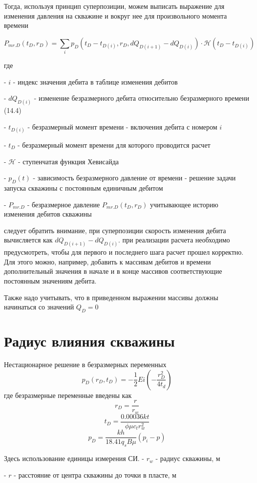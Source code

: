 \documentclass[oneside, openany]{memoir}
\begin{document}
	Тогда, используя принцип суперпозиции, можем выписать выражение для изменения давления на скважине и вокруг нее для произвольного момента времени
	
	$$P_{mr.D}(t_D, r_D) = \sum_i  p_D\left(t_D-t_{D(i)}, r_D, dQ_{D(i+1)} - dQ_{D(i)}\right)\cdot \mathcal{H}(t_D-t_{D(i)}) $$
	
	где
	
	- $i$ - индекс значения дебита в таблице изменения дебитов
	
	- $dQ_{D(i)}$ - изменение безразмерного дебита относительно безразмерного времени (14.4) 
	
	- $t_{D(i)}$ - безразмерный момент времени - включения дебита с номером $i$
	
	- $t_{D}$ - безразмерный момент времени для которого проводится расчет
	
	- $\mathcal{H}$ - ступенчатая функция Хевисайда
	
	- $p_D\left(t\right)$ - зависимость безразмерного давление от времени - решение задачи запуска скважины с постоянным единичным дебитом
	
	- $P_{mr.D} $ - безразмерное давление $P_{mr.D}(t_D, r_D)$ учитывающее историю изменения дебитов скважины
	
	следует обратить внимание, при суперпозиции скорость изменения дебита вычисляется как $dQ_{D(i+1)} - dQ_{D(i)}$.  при реализации расчета необходимо предусмотреть, чтобы для первого и последнего шага расчет прошел корректно. Для этого можно, например, добавить к массивам дебитов и времени дополнительный значения в начале и в конце массивов соответствующие постоянным значениям дебита. 
	
	Также надо учитывать, что в приведенном выражении массивы должны начинаться со значений $Q_D=0$
	
	\section{Радиус влияния скважины}
	
	
	Нестационарное решение в безразмерных переменных
	$$ 
	p_D(r_D,t_D) = - \frac{1}{2} Ei \left(- \dfrac{ r_D^2}{4t_d} \right)
	$$
	где безразмерные переменные введены как
	$$ r_D = \frac{r}{r_w}  $$
	$$ t_D = \frac{0.00036 kt}{\phi \mu c_t r_w^2}  $$
	$$ p_D = \frac{kh}{ 18.41 q_s B \mu} \left( p_i - p \right)   $$
	
	Здесь использование единицы измерения СИ.
	- $r_w$ - радиус скважины, м
	
	- $r$ - расстояние от центра скважины до точки в пласте, м
	
\end{document}
